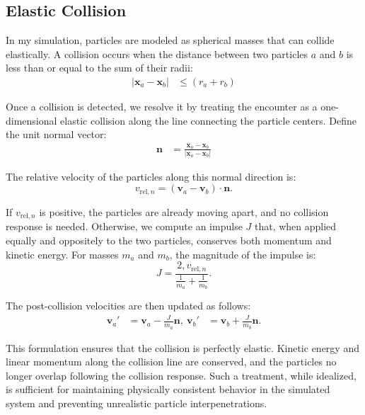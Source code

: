 \documentclass[a4paper, 12pt, oneside, onecolumn]{article}
\begin{document}
\begin{multicols}{2}
\subsection{Elastic Collision}

In my simulation, particles are modeled as spherical masses that can collide elastically. A collision occurs when the distance between two particles $a$ and $b$ is less than or equal to the sum of their radii:
\begin{align}
	\left|\mathbf{x}_a - \mathbf{x}_b \right|
	& \leq \left( r_a + r_b \right)
\end{align}

Once a collision is detected, we resolve it by treating the encounter as a one-dimensional elastic collision along the line connecting the particle centers. Define the unit normal vector:
\begin{align}
	\mathbf{n}
	&= \frac{\mathbf{x}_a - \mathbf{x}_b}{\left|\mathbf{x}_a - \mathbf{x}_b\right|}
\end{align}

The relative velocity of the particles along this normal direction is: \begin{equation} v_{\text{rel}, n} = \left(\mathbf{v}_a - \mathbf{v}_b\right) \cdot \mathbf{n}. \end{equation}

If $v_{\text{rel}, n}$ is positive, the particles are already moving apart, and no collision response is needed. Otherwise, we compute an impulse $J$ that, when applied equally and oppositely to the two particles, conserves both momentum and kinetic energy. For masses $m_a$ and $m_b$, the magnitude of the impulse is: \begin{equation} J = \frac{2,v_{\text{rel}, n}}{\frac{1}{m_a} + \frac{1}{m_b}}. \end{equation}

The post-collision velocities are then updated as follows: \begin{align} \mathbf{v}_a' &= \mathbf{v}_a - \frac{J}{m_a}\mathbf{n}, \ \mathbf{v}_b' &= \mathbf{v}_b + \frac{J}{m_b}\mathbf{n}. \end{align}

This formulation ensures that the collision is perfectly elastic. Kinetic energy and linear momentum along the collision line are conserved, and the particles no longer overlap following the collision response. Such a treatment, while idealized, is sufficient for maintaining physically consistent behavior in the simulated system and preventing unrealistic particle interpenetrations.



\end{multicols}
\end{document}

